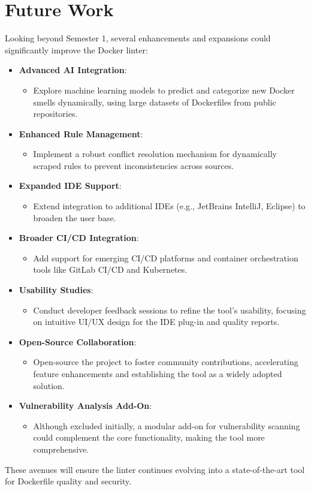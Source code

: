 \section{Future Work}
Looking beyond Semester 1, several enhancements and expansions could significantly improve the Docker linter:
\begin{itemize}
    \item \textbf{Advanced AI Integration}:
    \begin{itemize}
        \item Explore machine learning models to predict and categorize new Docker smells dynamically, using large datasets of Dockerfiles from public repositories.
    \end{itemize}
    \item \textbf{Enhanced Rule Management}:
    \begin{itemize}
        \item Implement a robust conflict resolution mechanism for dynamically scraped rules to prevent inconsistencies across sources.
    \end{itemize}
    \item \textbf{Expanded IDE Support}:
    \begin{itemize}
        \item Extend integration to additional IDEs (e.g., JetBrains IntelliJ, Eclipse) to broaden the user base.
    \end{itemize}
    \item \textbf{Broader CI/CD Integration}:
    \begin{itemize}
        \item Add support for emerging CI/CD platforms and container orchestration tools like GitLab CI/CD and Kubernetes.
    \end{itemize}
    \item \textbf{Usability Studies}:
    \begin{itemize}
        \item Conduct developer feedback sessions to refine the tool's usability, focusing on intuitive UI/UX design for the IDE plug-in and quality reports.
    \end{itemize}
    \item \textbf{Open-Source Collaboration}:
    \begin{itemize}
        \item Open-source the project to foster community contributions, accelerating feature enhancements and establishing the tool as a widely adopted solution.
    \end{itemize}
    \item \textbf{Vulnerability Analysis Add-On}:
    \begin{itemize}
        \item Although excluded initially, a modular add-on for vulnerability scanning could complement the core functionality, making the tool more comprehensive.
    \end{itemize}
\end{itemize}

These avenues will ensure the linter continues evolving into a state-of-the-art tool for Dockerfile quality and security.

